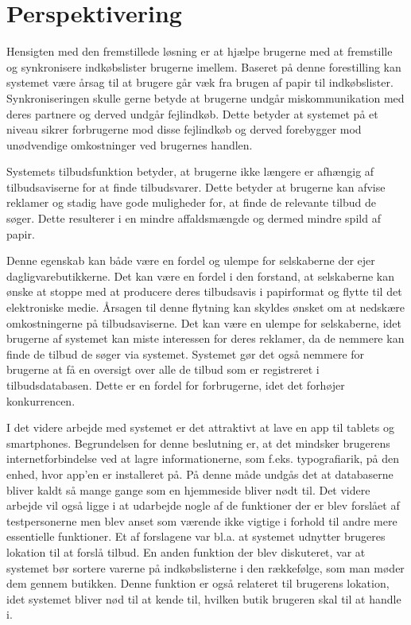 \section{Perspektivering}
Hensigten med den fremstillede løsning er at hjælpe brugerne med at fremstille og synkronisere indkøbslister brugerne imellem. Baseret på denne forestilling kan systemet være årsag til at brugere går væk fra brugen af papir til indkøbslister.
Synkroniseringen skulle gerne betyde at brugerne undgår miskommunikation med deres partnere og derved undgår fejlindkøb. Dette betyder at systemet på et niveau sikrer forbrugerne mod disse fejlindkøb og derved forebygger mod unødvendige omkostninger ved brugernes handlen.

Systemets tilbudsfunktion betyder, at brugerne ikke længere er afhængig af tilbudsaviserne for at finde tilbudsvarer. Dette betyder at brugerne kan afvise reklamer og stadig have gode muligheder for, at finde de relevante tilbud de søger. Dette resulterer i en mindre affaldsmængde og dermed mindre spild af papir.

Denne egenskab kan både være en fordel og ulempe for selskaberne der ejer dagligvarebutikkerne. Det kan være en fordel i den forstand, at selskaberne kan ønske at stoppe med at producere deres tilbudsavis i papirformat og flytte til det elektroniske medie. Årsagen til denne flytning kan skyldes ønsket om at nedskære omkostningerne på tilbudsaviserne.
Det kan være en ulempe for selskaberne, idet brugerne af systemet kan miste interessen for deres reklamer, da de nemmere kan finde de tilbud de søger via systemet.
Systemet gør det også nemmere for brugerne at få en oversigt over alle de tilbud som er registreret i tilbudsdatabasen. Dette er en fordel for forbrugerne, idet det forhøjer konkurrencen.

I det videre arbejde med systemet er det attraktivt at lave en app til tablets og smartphones. Begrundelsen for denne beslutning er, at det mindsker brugerens internetforbindelse ved at lagre informationerne, som f.eks. typografiarik, på den enhed, hvor app'en er installeret på. På denne måde undgås det at databaserne bliver kaldt så mange gange som en hjemmeside bliver nødt til.
Det videre arbejde vil også ligge i at udarbejde nogle af de funktioner der er blev forslået af testpersonerne men blev anset som værende ikke vigtige i forhold til andre mere essentielle funktioner. Et af forslagene var bl.a. at systemet udnytter brugeres lokation til at forslå tilbud. En anden funktion der blev diskuteret, var at systemet bør sortere varerne på indkøbslisterne i den rækkefølge, som man møder dem gennem butikken. Denne funktion er også relateret til brugerens lokation, idet systemet bliver nød til at kende til, hvilken butik brugeren skal til at handle i.

